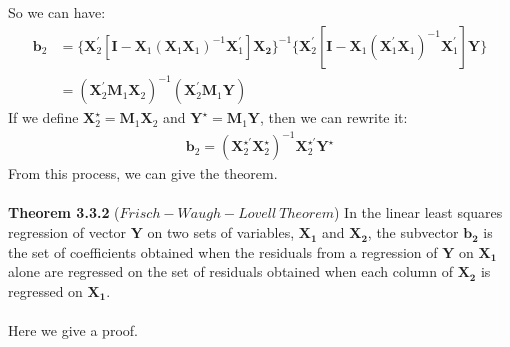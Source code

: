 \documentclass{article}
\begin{document}
So we can have:
	\begin{align*}
				\boldsymbol{b}_2 &= \{\boldsymbol{X}^\prime_2 [\boldsymbol{I} - \boldsymbol{X}_1 (\boldsymbol{X}_1 \boldsymbol{X}_1)^{-1}\boldsymbol{X}^\prime_1] \boldsymbol{X_2}\}^{-1} \{\boldsymbol{X}^\prime_2 [\boldsymbol{I} - \boldsymbol{X}_1 (\boldsymbol{X}^\prime_1 \boldsymbol{X}_1)^{-1} \boldsymbol{X}^\prime_1]\boldsymbol{Y}\}\\
				&= (\boldsymbol{X}^\prime_2 \boldsymbol{M}_1 \boldsymbol{X}_2)^{-1} (\boldsymbol{X}^\prime_2 \boldsymbol{M}_1 \boldsymbol{Y})
	\end{align*}
If we define $\boldsymbol{X}^\star_2 = \boldsymbol{M}_1 \boldsymbol{X}_2$ and $\boldsymbol{Y}^\star = \boldsymbol{M}_1 \boldsymbol{Y}$, then we can rewrite it:
	\begin{align*}
		\boldsymbol{b}_2 = (\boldsymbol{X}^{\star\prime}_2 \boldsymbol{X}^\star_2)^{-1} \boldsymbol{X}^{\star\prime}_2 \boldsymbol{Y}^\star
	\end{align*}
From this process, we can give the theorem.\\\\
\textbf{Theorem 3.3.2} ($Frisch-Waugh-Lovell\ Theorem$)
In the linear least squares regression of vector $\boldsymbol{Y}$ on two sets of variables, $\boldsymbol{X_1}$ and $\boldsymbol{X_2}$, the subvector $\boldsymbol{b_2}$ is the set of coefficients obtained when the residuals from a regression of $\boldsymbol{Y}$ on $\boldsymbol{X_1}$ alone are regressed on the set of residuals obtained when each column of $\boldsymbol{X_2}$ is regressed on $\boldsymbol{X_1}$.\\\\
Here we give a proof.
\end{document}
